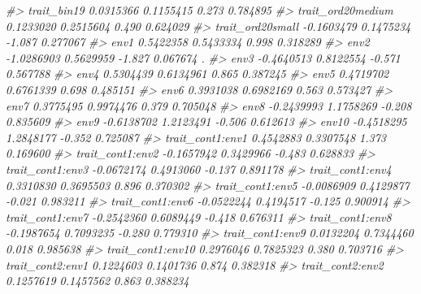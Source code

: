 \documentclass[
]{article}
\newenvironment{Shaded}{\begin{snugshade}}{\end{snugshade}}
\newcommand{\CommentTok}[1]{\textcolor[rgb]{0.56,0.35,0.01}{\textit{#1}}}
\begin{document}
\begin{Shaded}
\begin{Highlighting}[]
\CommentTok{\#\textgreater{} trait\_bin19                    0.0315366  0.1155415   0.273 0.784895    }
\CommentTok{\#\textgreater{} trait\_ord20medium              0.1233020  0.2515604   0.490 0.624029    }
\CommentTok{\#\textgreater{} trait\_ord20small              {-}0.1603479  0.1475234  {-}1.087 0.277067    }
\CommentTok{\#\textgreater{} env1                           0.5422358  0.5433334   0.998 0.318289    }
\CommentTok{\#\textgreater{} env2                          {-}1.0286903  0.5629959  {-}1.827 0.067674 .  }
\CommentTok{\#\textgreater{} env3                          {-}0.4640513  0.8122554  {-}0.571 0.567788    }
\CommentTok{\#\textgreater{} env4                           0.5304439  0.6134961   0.865 0.387245    }
\CommentTok{\#\textgreater{} env5                           0.4719702  0.6761339   0.698 0.485151    }
\CommentTok{\#\textgreater{} env6                           0.3931038  0.6982169   0.563 0.573427    }
\CommentTok{\#\textgreater{} env7                           0.3775495  0.9974476   0.379 0.705048    }
\CommentTok{\#\textgreater{} env8                          {-}0.2439993  1.1758269  {-}0.208 0.835609    }
\CommentTok{\#\textgreater{} env9                          {-}0.6138702  1.2123491  {-}0.506 0.612613    }
\CommentTok{\#\textgreater{} env10                         {-}0.4518295  1.2848177  {-}0.352 0.725087    }
\CommentTok{\#\textgreater{} trait\_cont1:env1               0.4542883  0.3307548   1.373 0.169600    }
\CommentTok{\#\textgreater{} trait\_cont1:env2              {-}0.1657942  0.3429966  {-}0.483 0.628833    }
\CommentTok{\#\textgreater{} trait\_cont1:env3              {-}0.0672174  0.4913060  {-}0.137 0.891178    }
\CommentTok{\#\textgreater{} trait\_cont1:env4               0.3310830  0.3695503   0.896 0.370302    }
\CommentTok{\#\textgreater{} trait\_cont1:env5              {-}0.0086909  0.4129877  {-}0.021 0.983211    }
\CommentTok{\#\textgreater{} trait\_cont1:env6              {-}0.0522244  0.4194517  {-}0.125 0.900914    }
\CommentTok{\#\textgreater{} trait\_cont1:env7              {-}0.2542360  0.6089449  {-}0.418 0.676311    }
\CommentTok{\#\textgreater{} trait\_cont1:env8              {-}0.1987654  0.7093235  {-}0.280 0.779310    }
\CommentTok{\#\textgreater{} trait\_cont1:env9               0.0132204  0.7344460   0.018 0.985638    }
\CommentTok{\#\textgreater{} trait\_cont1:env10              0.2976046  0.7825323   0.380 0.703716    }
\CommentTok{\#\textgreater{} trait\_cont2:env1               0.1224603  0.1401736   0.874 0.382318    }
\CommentTok{\#\textgreater{} trait\_cont2:env2               0.1257619  0.1457562   0.863 0.388234    }

\end{Highlighting}
\end{Shaded}
\end{document}
